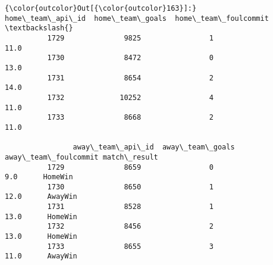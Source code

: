 \documentclass[11pt]{article}
\begin{document}
\begin{Verbatim}[commandchars=\\\{\}]
{\color{outcolor}Out[{\color{outcolor}163}]:}       home\_team\_api\_id  home\_team\_goals  home\_team\_foulcommit  \textbackslash{}
          1729              9825                1                  11.0   
          1730              8472                0                  13.0   
          1731              8654                2                  14.0   
          1732             10252                4                  11.0   
          1733              8668                2                  11.0   
          
                away\_team\_api\_id  away\_team\_goals  away\_team\_foulcommit match\_result  
          1729              8659                0                   9.0      HomeWin  
          1730              8650                1                  12.0      AwayWin  
          1731              8528                1                  13.0      HomeWin  
          1732              8456                2                  13.0      HomeWin  
          1733              8655                3                  11.0      AwayWin  
\end{Verbatim}
            
\end{document}
